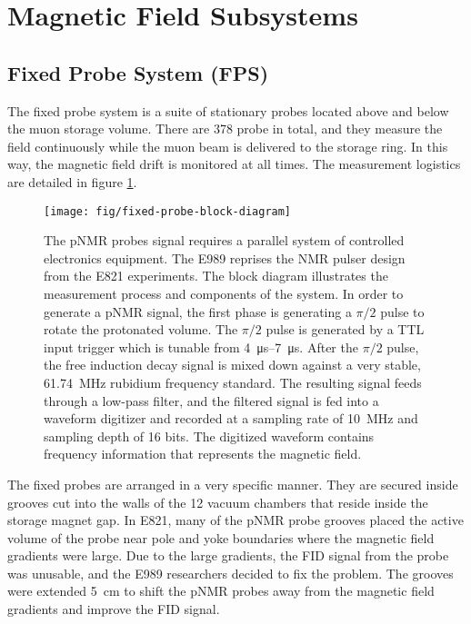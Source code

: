\section{Magnetic Field Subsystems} \label{sec:field-subsystems}

\subsection{Fixed Probe System (FPS)}

The fixed probe system is a suite of stationary probes located above and below the muon storage volume.  There are 378 probe in total, and they measure the field continuously while the muon beam is delivered to the storage ring.  In this way, the magnetic field drift is monitored at all times.  The measurement logistics are detailed in figure \ref{fig:fixed-probe-block-diagram}.

\begin{figure}
\label{fig:fixed-probe-block-diagram}
\centering
\texttt{[image: fig/fixed-probe-block-diagram]}
\caption{The pNMR probes signal requires a parallel system of controlled electronics equipment.  The E989 reprises the NMR pulser design from the E821 experiments. The block diagram illustrates the measurement process and components of the system.  In order to generate a pNMR signal, the first phase is generating a $\pi/2$ pulse to rotate the protonated volume.  The $\pi/2$ pulse is generated by a TTL input trigger which is tunable from \SIrange{4}{7}{\micro\second}.  After the $\pi/2$ pulse, the free induction decay signal is mixed down against a very stable, \SI{61.74}{\MHz} rubidium frequency standard.  The resulting signal feeds through a low-pass filter, and the filtered signal is fed into a waveform digitizer and recorded at a sampling rate of \SI{10}{\MHz} and sampling depth of 16 bits.  The digitized waveform contains frequency information that represents the magnetic field.}
\end{figure}

The fixed probes are arranged in a very specific manner.  They are secured inside grooves cut into the walls of the 12 vacuum chambers that reside inside the storage magnet gap.  In E821, many of the pNMR probe grooves placed the active volume of the probe near pole and yoke boundaries where the magnetic field gradients were large.  Due to the large gradients, the FID signal from the probe was unusable, and the E989 researchers decided to fix the problem.  The grooves were extended \SI{5}{\cm} to shift the pNMR probes away from the magnetic field gradients and improve the FID signal.

